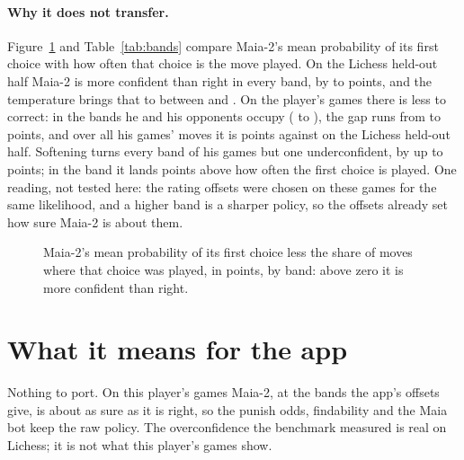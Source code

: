 \documentclass[11pt]{article}
\begin{document}
\paragraph{Why it does not transfer.} Figure~\ref{fig:gaps} and Table~\ref{tab:bands} compare
Maia-2's mean probability of its first choice with how often that choice is the move played. On
the Lichess held-out half Maia-2 is more confident than right in every band, by \LichGapMin{} to
\LichGapMax{} points, and the temperature brings that to between \LichTGapMin{} and
\LichTGapMax. On the player's games there is less to correct: in the bands he and his opponents
occupy (\HisBandLow{} to \HisBandHigh), the gap runs from \HisGapMin{} to \HisGapMax{} points,
and over all his games' moves it is \HisGapAll{} points against \LichGapAll{} on the Lichess
held-out half. Softening turns every band of his games but one underconfident, by up to
\HisTGapMax{} points; in the \HisTEvenBand{} band it lands \HisTEvenGap{} points above how often
the first choice is played. One reading, not tested here: the
rating offsets were chosen on these games for the same likelihood, and a higher band is a sharper
policy, so the offsets already set how sure Maia-2 is about them.

\begin{figure}[!htbp]
\centering
\GapFigure
\caption{Maia-2's mean probability of its first choice less the share of moves where that choice
was played, in points, by band: above zero it is more confident than right.}
\label{fig:gaps}
\end{figure}

\begin{table}[!htbp]
\centering\scriptsize
\setlength{\tabcolsep}{4pt}
\BandTable
\caption{By band: the fitting moves and the fitted temperature, then, on the Lichess held-out
half and on the player's games, the share of moves where Maia-2's first choice was played and its
mean probability, raw and tempered (percent).}
\label{tab:bands}
\end{table}

\section{What it means for the app}

Nothing to port. On this player's games Maia-2, at the bands the app's offsets give, is about
as sure as it is right, so the punish odds, findability and the Maia bot keep the raw policy.
The overconfidence the benchmark measured is real on Lichess; it is not what this player's games
show.
\end{document}
